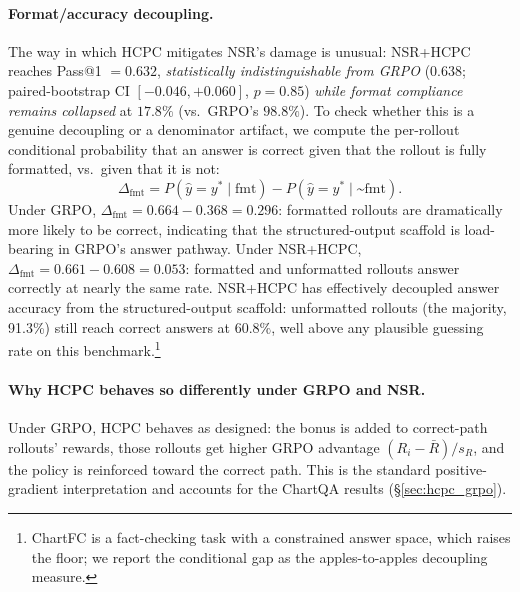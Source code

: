 \documentclass[11pt]{article}
\begin{document}
\paragraph{Format/accuracy decoupling.} The way in which HCPC
mitigates NSR's damage is unusual: NSR+HCPC reaches Pass@1 $=0.632$,
\emph{statistically indistinguishable from GRPO} ($0.638$;
paired-bootstrap CI $[-0.046,+0.060]$, $p{=}0.85$)
\emph{while format compliance remains collapsed} at $17.8\%$ (vs.\
GRPO's $98.8\%$). To check whether this is a genuine decoupling or
a denominator artifact, we compute the per-rollout conditional
probability that an answer is correct given that the rollout is
fully formatted, vs.\ given that it is not:
\[
\Delta_{\text{fmt}} = P(\hat y=y^*\mid\text{fmt}) - P(\hat y=y^*\mid\text{\textasciitilde fmt}).
\]
Under GRPO, $\Delta_{\text{fmt}} = 0.664 - 0.368 = 0.296$:
formatted rollouts are dramatically more likely to be correct,
indicating that the structured-output scaffold is load-bearing in
GRPO's answer pathway. Under NSR+HCPC, $\Delta_{\text{fmt}} =
0.661 - 0.608 = 0.053$: formatted and unformatted rollouts answer
correctly at nearly the same rate. NSR+HCPC has effectively
decoupled answer accuracy from the structured-output scaffold:
unformatted rollouts (the majority, 91.3\%) still reach correct
answers at $60.8\%$, well above any plausible guessing rate on this
benchmark.\footnote{ChartFC is a fact-checking task with a
constrained answer space, which raises the floor; we report the
conditional gap as the apples-to-apples decoupling measure.}

\paragraph{Why HCPC behaves so differently under GRPO and NSR.}
Under GRPO, HCPC behaves as designed: the bonus is added to
correct-path rollouts' rewards, those rollouts get higher GRPO
advantage $(R_i - \bar R)/s_R$, and the policy is reinforced toward
the correct path. This is the standard positive-gradient
interpretation and accounts for the ChartQA results
(\S\ref{sec:hcpc_grpo}).
\end{document}
